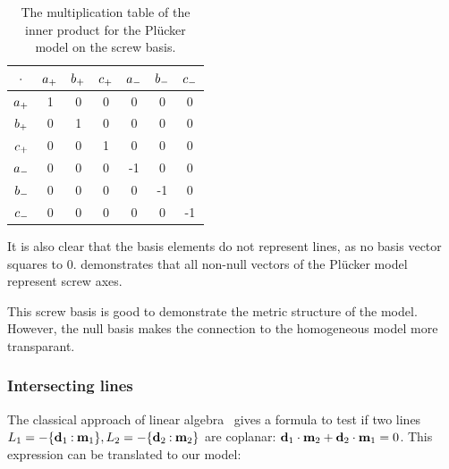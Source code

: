 \begin{table}
  \caption{The multiplication table of the inner product for the Pl\"ucker model on the screw basis.}
  \label{tab:screwmetric}
  \begin{center}
    \begin{tabular}{|c||c|c|c|c|c|c|}
      \hline
      $\mathbin{\cdot}$ & $a_{+}$ & $b_{+}$ & $c_{+}$ & $a_{-}$ & $b_{-}$ & $c_{-}$ \\
      \hline \hline
      $a_{+}$ & 1 & 0 & 0 & 0 & 0 & 0 \\
      \hline
      $b_{+}$ & 0 & 1 & 0 & 0 & 0 & 0 \\
      \hline
      $c_{+}$ & 0 & 0 & 1 & 0 & 0 & 0 \\
      \hline
      $a_{-}$ & 0 & 0 & 0 & -1 & 0 & 0 \\
      \hline
      $b_{-}$ & 0 & 0 & 0 & 0 & -1 & 0 \\
      \hline
      $c_{-}$ & 0 & 0 & 0 & 0 & 0 & -1 \\
      \hline
    \end{tabular}
  \end{center}
\end{table}

It is also clear that the basis elements do not represent lines, as no basis vector squares to $0$.   demonstrates that all non-null vectors of the Pl\"ucker model represent screw axes.  

This screw basis is good to demonstrate the metric structure of the model.  However, the null basis makes the connection to the homogeneous model more transparant.  

\subsubsection{Intersecting lines}
The classical approach of linear algebra~\cite{Shoemake} gives a formula to test if two lines $L_1 = -\{\mathbf{d}_1 \mathbin{:} \mathbf{m}_1\}, L_2 = -\{\mathbf{d}_2 \mathbin{:} \mathbf{m}_2\}$ are coplanar: $\mathbf{d}_1 \mathbin{\cdot} \mathbf{m}_2 + \mathbf{d}_2 \mathbin{\cdot} \mathbf{m}_1 = 0$.  This expression can be translated to our model:

